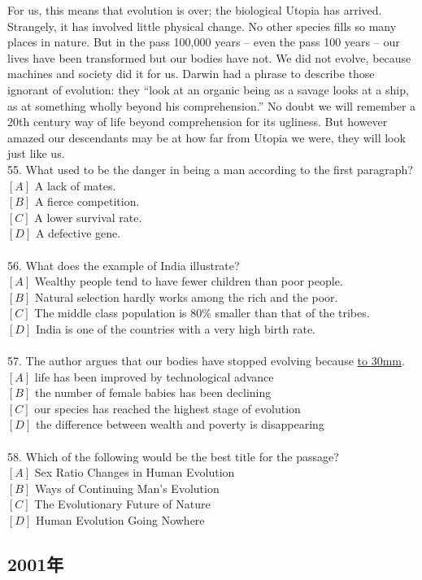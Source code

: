 \documentclass[a4paper]{article}
\begin{document}
\par
For us, this means that evolution is over; the biological Utopia has arrived. Strangely, it has involved little physical change. No other species fills so many places in nature. But in the pass 100,000 years -- even the pass 100 years -- our lives have been transformed but our bodies have not. We did not evolve, because machines and society did it for us. Darwin had a phrase to describe those ignorant of evolution: they “look at an organic being as a savage looks at a ship, as at something wholly beyond his comprehension.” No doubt we will remember a 20th century way of life beyond comprehension for its ugliness. But however amazed our descendants may be at how far from Utopia we were, they will look just like us.
\\55.	What used to be the danger in being a man according to the first paragraph?\\$[A]$ A lack of mates.\\$[B]$ A fierce competition.\\$[C]$ A lower survival rate.\\$[D]$ A defective gene.\\\\56.	What does the example of India illustrate?\\$[A]$ Wealthy people tend to have fewer children than poor people.\\$[B]$ Natural selection hardly works among the rich and the poor.\\$[C]$ The middle class population is 80\% smaller than that of the tribes.\\$[D]$ India is one of the countries with a very high birth rate.\\\\57.	The author argues that our bodies have stopped evolving because \underline{\hbox to 30mm{}}.\\$[A]$ life has been improved by technological advance\\$[B]$ the number of female babies has been declining\\$[C]$ our species has reached the highest stage of evolution\\$[D]$ the difference between wealth and poverty is disappearing\\\\58.	Which of the following would be the best title for the passage?\\$[A]$ Sex Ratio Changes in Human Evolution\\$[B]$ Ways of Continuing Man’s Evolution\\$[C]$ The Evolutionary Future of Nature\\$[D]$ Human Evolution Going Nowhere\\\subsection{2001年}
\end{document}
